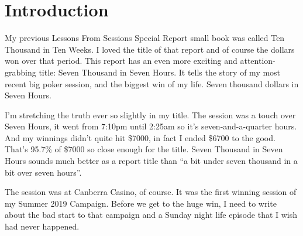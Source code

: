 \chapter{Introduction}


My previous Lessons From Sessions Special Report small book was
called Ten Thousand in Ten Weeks. I loved the title of that
report and of course the dollars won over that period.
This report has an even more exciting and attention-grabbing title: Seven
Thousand in Seven Hours. It tells the story of my most recent big
poker session, and the biggest win of my life. Seven thousand dollars
in Seven Hours.

I'm stretching the truth ever so slightly in my title. The session was
a touch over Seven Hours, it went from 7:10pm until 2:25am so it's
seven-and-a-quarter hours. And my winnings didn't quite hit \$7000, in
fact I ended \$6700 to the good. That's 95.7\% of \$7000 so close enough
for the title. Seven Thousand in Seven Hours sounds much better as a
report title than ``a bit under seven thousand in a bit over seven
hours''.

The session was at Canberra Casino, of course. It was the first winning
session of my Summer 2019 Campaign. Before we get to the huge win, I
need to write about the bad start to that campaign and a Sunday night
life episode that I wish had never happened.







